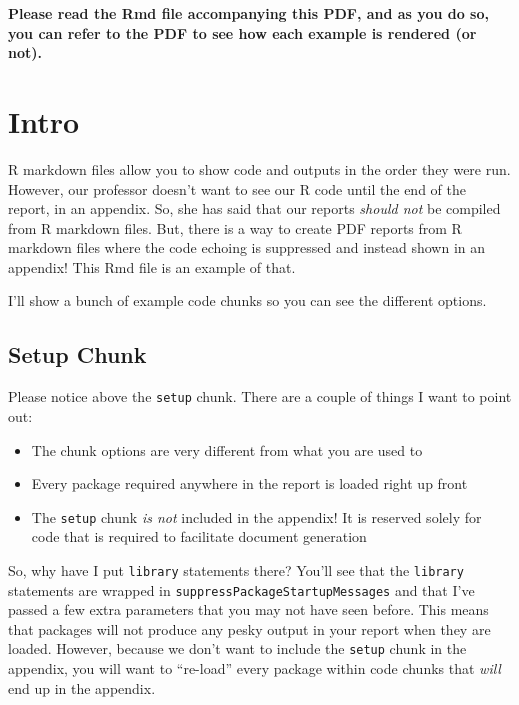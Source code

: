 \documentclass[
]{article}
\author{}
\date{\vspace{-2.5em}}
\providecommand{\tightlist}{%
  \setlength{\itemsep}{0pt}\setlength{\parskip}{0pt}}
\begin{document}
\textbf{Please read the Rmd file accompanying this PDF, and as you do
so, you can refer to the PDF to see how each example is rendered (or
not).}

\hypertarget{intro}{%
\section{Intro}\label{intro}}

R markdown files allow you to show code and outputs in the order they
were run. However, our professor doesn't want to see our R code until
the end of the report, in an appendix. So, she has said that our reports
\emph{should not} be compiled from R markdown files. But, there is a way
to create PDF reports from R markdown files where the code echoing is
suppressed and instead shown in an appendix! This Rmd file is an example
of that.

I'll show a bunch of example code chunks so you can see the different
options.

\hypertarget{setup-chunk}{%
\subsection{Setup Chunk}\label{setup-chunk}}

Please notice above the \texttt{setup} chunk. There are a couple of
things I want to point out:

\begin{itemize}
\tightlist
\item
  The chunk options are very different from what you are used to
\item
  Every package required anywhere in the report is loaded right up front
\item
  The \texttt{setup} chunk \emph{is not} included in the appendix! It is
  reserved solely for code that is required to facilitate document
  generation
\end{itemize}

So, why have I put \texttt{library} statements there? You'll see that
the \texttt{library} statements are wrapped in
\texttt{suppressPackageStartupMessages} and that I've passed a few extra
parameters that you may not have seen before. This means that packages
will not produce any pesky output in your report when they are loaded.
However, because we don't want to include the \texttt{setup} chunk in
the appendix, you will want to ``re-load'' every package within code
chunks that \emph{will} end up in the appendix.
\end{document}

